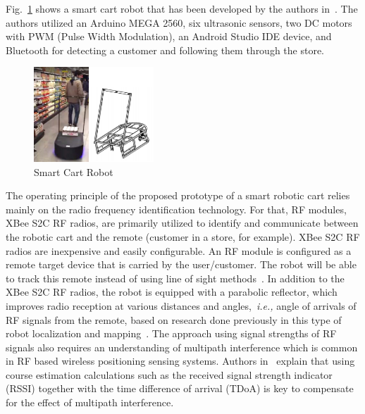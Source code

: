 \documentclass[conference]{IEEEtran}
\begin{document}
%
Fig.~\ref{fig:SmartCart} shows a smart cart robot that has been developed by the authors in~\cite{Rawashdeh2017-Person}. The authors utilized an Arduino MEGA 2560, six
ultrasonic sensors, two DC motors with PWM (Pulse Width Modulation), an Android
Studio IDE device, and Bluetooth for detecting a customer and following them
through the store. %
%
\begin{figure}[htpb]
   \centering
   \includegraphics[width=0.40\textwidth]{figs/img/SmartCart}
   \caption{Smart Cart Robot}
   \label{fig:SmartCart}
\end{figure}
%
The operating principle of the proposed prototype of a smart robotic cart relies mainly on the radio frequency identification technology. For that, RF modules, XBee S2C RF radios, are primarily utilized to identify and communicate between the robotic cart and the remote (customer in a store, for example). XBee S2C RF radios are inexpensive and easily configurable. An RF module is configured as a remote target device that is carried
by the user/customer. The robot will be able to track this remote instead of using line
of sight methods~\cite{Miah2018-Intelligent}. In addition to the XBee S2C RF
radios, the robot is equipped with a parabolic reflector, which improves radio
reception at various distances and angles,~\textit{i.e.,} angle of arrivals of
RF signals from the remote, based on research done previously in this type of
robot localization and mapping~\cite{Miah2018-Intelligent,Li2013ANA}. The approach using signal strengths of RF signals also requires an understanding
of multipath interference which is common in RF based wireless positioning
sensing systems. Authors in~\cite{xie_jiang_zhao_zhang_2019} explain that using
course estimation calculations such as the received signal strength indicator (RSSI)
 together with the time difference of arrival (TDoA) is key to compensate for the effect of multipath
interference. 
\end{document}
